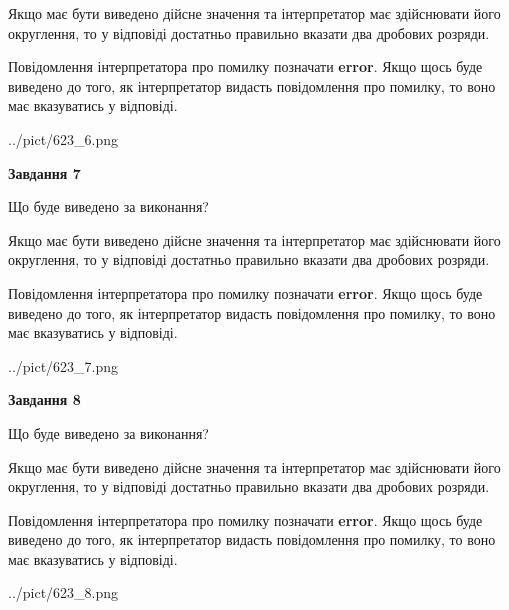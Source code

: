 \documentclass[12pt, ukrainian]{article}
\begin{document}
{\begin {Large}
Якщо має бути виведено дійсне значення та інтерпретатор має здійснювати його округлення, 
то у відповіді достатньо правильно вказати два дробових розряди.

Повідомлення інтерпретатора про помилку позначати \textbf{error}.
Якщо щось буде виведено до того, як інтерпретатор видасть повідомлення про помилку, 
то воно має вказуватись у відповіді. \par

\begin{center}
	{../pict/623_6.png}
\end{center}
\newpage

{\begin {center}\textbf{Завдання 7}\end {center}}\par
Що буде виведено за виконання? \par

Якщо має бути виведено дійсне значення та інтерпретатор має здійснювати його округлення, 
то у відповіді достатньо правильно вказати два дробових розряди.

Повідомлення інтерпретатора про помилку позначати \textbf{error}.
Якщо щось буде виведено до того, як інтерпретатор видасть повідомлення про помилку, 
то воно має вказуватись у відповіді. \par

\begin{center}
	{../pict/623_7.png}
\end{center}
\newpage

{\begin {center}\textbf{Завдання 8}\end {center}}\par
Що буде виведено за виконання? \par

Якщо має бути виведено дійсне значення та інтерпретатор має здійснювати його округлення, 
то у відповіді достатньо правильно вказати два дробових розряди.

Повідомлення інтерпретатора про помилку позначати \textbf{error}.
Якщо щось буде виведено до того, як інтерпретатор видасть повідомлення про помилку, 
то воно має вказуватись у відповіді. \par

\begin{center}
	{../pict/623_8.png}
\end{center}
\newpage


\end{Large}}
\end{document}
